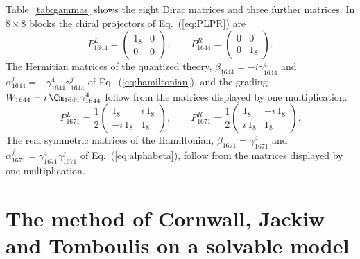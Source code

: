 Table~\ref{tab:gammas} shows the eight Dirac matrices and three further matrices. In $8\times8$
blocks the chiral projectors of Eq.~(\ref{eq:PLPR}) are
\begin{equation}
P_{1644}^{L}=\begin{pmatrix}1_8&0\\0&0\end{pmatrix},\qquad
P_{1644}^{R}=\begin{pmatrix}0&0\\0&1_8\end{pmatrix}.
\end{equation}
The Hermitian matrices of the quantized theory, $\beta_{1644}=-i\gamma_{1644}^4$ and
$\alpha_{1644}^j=-\gamma_{1644}^4\gamma_{1644}^j$ of Eq.~(\ref{eq:hamiltonian}), and the grading
$W_{1644}=i\,\Cm_{1644}\gamma_{1644}^4$ follow from the matrices displayed by one multiplication.
\begin{equation}
P_{1671}^{L}=\frac12\begin{pmatrix}1_8&i\,1_8\\-i\,1_8&1_8\end{pmatrix},\qquad
P_{1671}^{R}=\frac12\begin{pmatrix}1_8&-i\,1_8\\i\,1_8&1_8\end{pmatrix}.
\end{equation}
The real symmetric matrices of the Hamiltonian, $\beta_{1671}=\gamma_{1671}^4$ and
$\alpha_{1671}^j=\gamma_{1671}^4\gamma_{1671}^j$ of Eq.~(\ref{eq:alphabeta}), follow from the matrices
displayed by one multiplication.

\section{The method of Cornwall, Jackiw and Tomboulis on a solvable model}
\label{app:toy}

